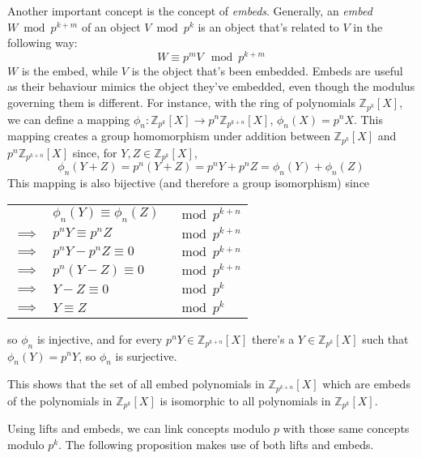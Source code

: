 \documentclass[a4paper, 12pt, reqno]{amsart}
\begin{document}
		Another important concept is the concept of \emph{embeds}. Generally, an \emph{embed} $W \bmod{p^{k+m}}$ of an object $V \bmod{p^k}$ is an object that's related to
		$V$ in the following way:
		\[
			W \equiv p^mV \mod{p^{k+m}}
		\]
		$W$ is the embed, while $V$ is the object that's been embedded.
		Embeds are useful as their behaviour mimics the object they've embedded, even though the modulus governing them is different. For instance, with the ring of
		polynomials $\mathds{Z}_{p^k}[X]$, we can define a mapping $\phi_{n} : \mathds{Z}_{p^k}[X] \rightarrow p^n\mathds{Z}_{p^{k+n}}[X]$, $\phi_{n}(X) = p^nX$. This
		mapping creates a group homomorphism under addition between $\mathds{Z}_{p^k}[X]$ and $p^n\mathds{Z}_{p^{k+n}}[X]$ since, for $Y, Z \in \mathds{Z}_{p^k}[X]$,
		\[
			\phi_n(Y + Z) = p^n(Y + Z) = p^nY + p^nZ = \phi_n(Y) + \phi_n(Z)
		\]
		This mapping is also bijective (and therefore a group isomorphism) since 
		\begin{center}
			\begin{tabular}{*3{l}}
						   & $\phi_n(Y) \equiv \phi_n(Z)$ & $\mod{p^{k+n}}$ \\
				$\implies$ & $p^nY \equiv p^nZ$           & $\mod{p^{k+n}}$ \\
				$\implies$ & $p^nY - p^nZ \equiv 0$       & $\mod{p^{k+n}}$ \\
				$\implies$ & $p^n(Y - Z) \equiv 0$        & $\mod{p^{k+n}}$ \\
				$\implies$ & $Y - Z \equiv 0$             & $\mod{p^k}$     \\
				$\implies$ & $Y \equiv Z$                 & $\mod{p^k}$
			\end{tabular}
		\end{center}
		so $\phi_n$ is injective, and for every $p^nY \in \mathds{Z}_{p^{k+n}}[X]$ there's a $Y \in \mathds{Z}_{p^k}[X]$ such that $\phi_n(Y) = p^nY$, so $\phi_n$ is 
		surjective.
		
		This shows that the set of all embed polynomials in $\mathds{Z}_{p^{k+n}}[X]$ which are embeds of the polynomials in $\mathds{Z}_{p^k}[X]$ is isomorphic to all 
		polynomials in $\mathds{Z}_{p^k}[X]$.
		
		Using lifts and embeds, we can link concepts modulo $p$ with those same concepts modulo $p^k$. The following proposition makes use of both lifts 
		and embeds.
		
\end{document}
